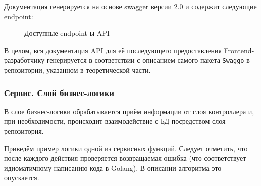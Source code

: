 \documentclass[diploma]{SCWorks}
\begin{document}
Документация генерируется на основе swagger версии 2.0 и содержит следующие 
endpoint:

\begin{figure}[H]
	\caption{Доступные endpoint-ы API}
	\label{pic:doc_endpoints}
\end{figure}

В целом, вся документация API для её последующего предоставления 
Frontend-разработчику генерируется в соответствии с описанием самого пакета
\texttt{Swaggo} в репозитории, указанном в теоретической части.

\subsubsection{Сервис. Слой бизнес-логики}

В слое бизнес-логики обрабатывается приём информации от слоя контроллера и, при
необходимости, происходит взаимодействие с БД посредством слоя репозитория.

Приведём пример логики одной из сервисных функций. Следует отметить, что после 
каждого действия проверяется возвращаемая ошибка (что соответствует 
идиоматичному написанию кода в Golang). В описании алгоритма это опускается. 
\end{document}

